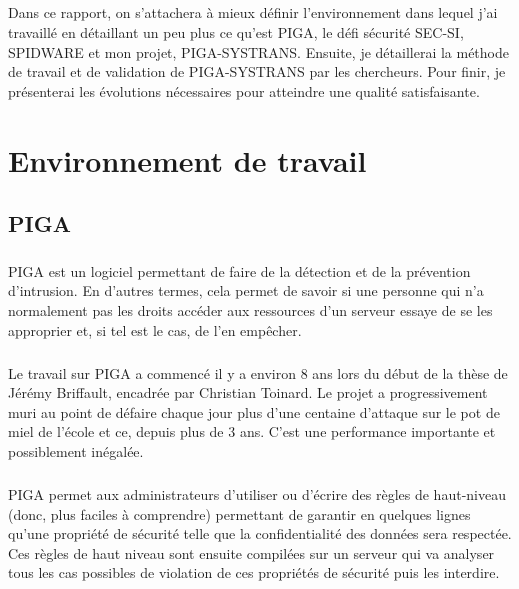 	\paragraph*{}
		Dans ce rapport, on s'attachera à mieux définir l'environnement dans lequel j'ai travaillé en détaillant un peu plus ce qu'est PIGA, le défi sécurité SEC-SI, SPIDWARE et mon projet, PIGA-SYSTRANS.
		Ensuite, je détaillerai la méthode de travail et de validation de PIGA-SYSTRANS par les chercheurs. Pour finir, je présenterai les évolutions nécessaires pour atteindre une qualité satisfaisante.

\chapter{Environnement de travail}
	\section{PIGA}
		\paragraph*{}
			PIGA est un logiciel permettant de faire de la détection et de la prévention d'intrusion. En d'autres termes, cela permet de savoir si une personne qui n'a normalement pas les droits accéder aux ressources d'un serveur essaye de se les approprier et, si tel est le cas, de l'en empêcher.

		\paragraph*{}
			Le travail sur PIGA a commencé il y a environ 8 ans lors du début de la thèse de Jérémy Briffault, encadrée par Christian Toinard. Le projet a progressivement muri au point de défaire chaque jour plus d'une centaine d'attaque sur le pot de miel de l'école et ce, depuis plus de 3 ans. C'est une performance importante et possiblement inégalée.
			
		\paragraph*{}
			PIGA permet aux administrateurs d'utiliser ou d'écrire des règles de haut-niveau (donc, plus faciles à comprendre) permettant de garantir en quelques lignes qu'une propriété de sécurité telle que la confidentialité des données sera respectée.\newline
			Ces règles de haut niveau sont ensuite compilées sur un serveur qui va analyser tous les cas possibles de violation de ces propriétés de sécurité puis les interdire.
			
